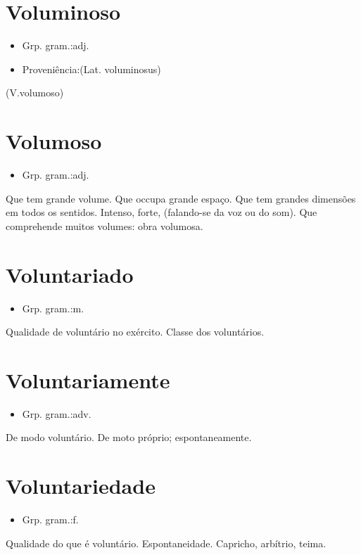 \documentclass{article}
\begin{document}
\section{Voluminoso}
\begin{itemize}
\item {Grp. gram.:adj.}
\end{itemize}
\begin{itemize}
\item {Proveniência:(Lat. \textunderscore voluminosus\textunderscore )}
\end{itemize}
(V.volumoso)
\section{Volumoso}
\begin{itemize}
\item {Grp. gram.:adj.}
\end{itemize}
Que tem grande volume.
Que occupa grande espaço.
Que tem grandes dimensões em todos os sentidos.
Intenso, forte, (falando-se da voz ou do som).
Que comprehende muitos volumes: \textunderscore obra volumosa\textunderscore .
\section{Voluntariado}
\begin{itemize}
\item {Grp. gram.:m.}
\end{itemize}
Qualidade de voluntário no exército.
Classe dos voluntários.
\section{Voluntariamente}
\begin{itemize}
\item {Grp. gram.:adv.}
\end{itemize}
De modo voluntário.
De moto próprio; espontaneamente.
\section{Voluntariedade}
\begin{itemize}
\item {Grp. gram.:f.}
\end{itemize}
Qualidade do que é voluntário.
Espontaneidade.
Capricho, arbítrio, teima.
\end{document}
